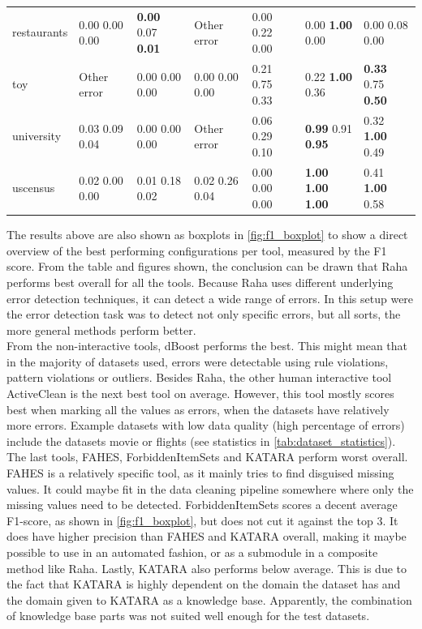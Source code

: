 \begin{table}[H]
\begin{adjustbox}{center}
\begin{tabular}{lllllll}
restaurants & 0.00 0.00 0.00 & \textbf{0.00} 0.07 \textbf{0.01} & Other error & 0.00 0.22 0.00 & 0.00 \textbf{1.00} 0.00 & 0.00 0.08 0.00 \\
toy & Other error & 0.00 0.00 0.00 & 0.00 0.00 0.00 & 0.21 0.75 0.33 & 0.22 \textbf{1.00} 0.36 & \textbf{0.33} 0.75 \textbf{0.50} \\
university & 0.03 0.09 0.04 & 0.00 0.00 0.00 & Other error & 0.06 0.29 0.10 & \textbf{0.99} 0.91 \textbf{0.95} & 0.32 \textbf{1.00} 0.49 \\
uscensus & 0.02 0.00 0.00 & 0.01 0.18 0.02 & 0.02 0.26 0.04 & 0.00 0.00 0.00 & \textbf{1.00} \textbf{1.00} \textbf{1.00} & 0.41 \textbf{1.00} 0.58 \\
\bottomrule
\end{tabular}
\end{adjustbox}
\end{table}

The results above are also shown as boxplots in \autoref{fig:f1_boxplot} to show a direct overview of the best performing configurations per tool, measured by the F1 score. From the table and figures shown, the conclusion can be drawn that Raha performs best overall for all the tools. Because Raha uses different underlying error detection techniques, it can detect a wide range of errors. In this setup were the error detection task was to detect not only specific errors, but all sorts, the more general methods perform better.
\\From the non-interactive tools, dBoost performs the best. This might mean that in the majority of datasets used, errors were detectable using rule violations, pattern violations or outliers. 
Besides Raha, the other human interactive tool ActiveClean is the next best tool on average. However, this tool mostly scores best when marking all the values as errors, when the datasets have relatively more errors. Example datasets with low data quality (high percentage of errors) include the datasets movie or flights (see statistics in \autoref{tab:dataset_statistics}). 
The last tools, FAHES, ForbiddenItemSets and KATARA perform worst overall. FAHES is a relatively specific tool, as it mainly tries to find disguised missing values. It could maybe fit in the data cleaning pipeline somewhere where only the missing values need to be detected. ForbiddenItemSets scores a decent average F1-score, as shown in \autoref{fig:f1_boxplot}, but does not cut it against the top 3. It does have higher precision than FAHES and KATARA overall, making it maybe possible to use in an automated fashion, or as a submodule in a composite method like Raha. Lastly, KATARA also performs below average. This is due to the fact that KATARA is highly dependent on the domain the dataset has and the domain given to KATARA as a knowledge base. Apparently, the combination of knowledge base parts was not suited well enough for the test datasets.

